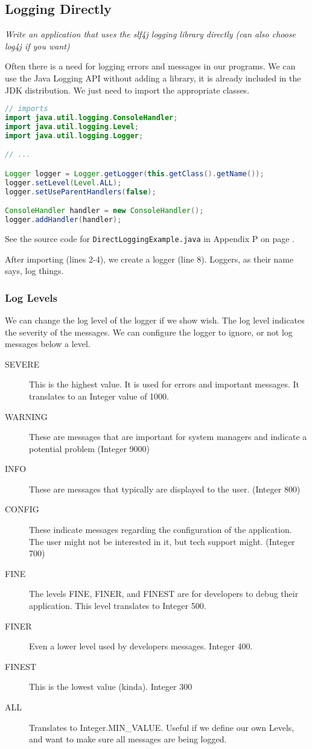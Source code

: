 \subsection{Logging Directly}
\textit{Write an application that uses the slf4j logging library directly (can also choose log4j if you want)}

Often there is a need for logging errors and messages in our programs. We can use the Java Logging API without adding a library, it is already included in the JDK distribution. We just need to import the appropriate classes.
\begin{lstlisting}[language=Java, label=lst:javaloggerlst]
// imports
import java.util.logging.ConsoleHandler;
import java.util.logging.Level;
import java.util.logging.Logger;

// ...

Logger logger = Logger.getLogger(this.getClass().getName());
logger.setLevel(Level.ALL);
logger.setUseParentHandlers(false);

ConsoleHandler handler = new ConsoleHandler();
logger.addHandler(handler);
\end{lstlisting}

See the source code for \texttt{DirectLoggingExample.java} in Appendix P on page \pageref{App:AppendixP}.

After importing (lines 2-4), we create a logger (line 8). Loggers, as their name says, log things. 

\subsubsection{Log Levels}
We can change the log level of the logger if we show wish. The log level indicates the severity of the messages. We can configure the logger to ignore, or not log messages below a level.
\begin{description}
\item[SEVERE] This is the highest value. It is used for errors and important messages. It translates to an Integer value of 1000.
\item[WARNING] These are messages that are important for system managers and indicate a potential problem (Integer 9000)
\item[INFO] These are messages that typically are displayed to the user. (Integer 800)
\item[CONFIG] These indicate messages regarding the configuration of the application. The user might not be interested in it, but tech support might. (Integer 700)
\item[FINE] The levels FINE, FINER, and FINEST are for developers to debug their application. This level translates to Integer 500.
\item[FINER] Even a lower level used by developers messages. Integer 400.
\item[FINEST] This is the lowest value (kinda). Integer 300
\item[ALL] Translates to Integer.MIN\_VALUE. Useful if we define our own Levels, and want to make sure all messages are being logged.
\end{description}


